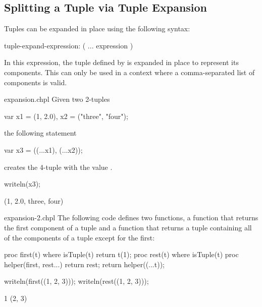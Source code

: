 \subsection{Splitting a Tuple via Tuple Expansion}
\label{Tuple_Expansion}

Tuples can be expanded in place using the following syntax:
\begin{syntax}
tuple-expand-expression:
  ( ... expression )
\end{syntax}
In this expression, the tuple defined by  is expanded
in place to represent its components.  This can only be used in a
context where a comma-separated list of components is valid.

\begin{chapelexample}{expansion.chpl}
Given two 2-tuples
\begin{chapel}
var x1 = (1, 2.0), x2 = ("three", "four");
\end{chapel}
the following statement
\begin{chapel}
var x3 = ((...x1), (...x2));
\end{chapel}
creates the 4-tuple  with the value .
\begin{chapelpost}
writeln(x3);
\end{chapelpost}
\begin{chapeloutput}
(1, 2.0, three, four)
\end{chapeloutput}
\end{chapelexample}

\begin{chapelexample}{expansion-2.chpl}
The following code defines two functions, a function  that
returns the first component of a tuple and a function  that
returns a tuple containing all of the components of a tuple except for
the first:
\begin{chapel}
proc first(t) where isTuple(t) {
  return t(1);
}
proc rest(t) where isTuple(t) {
  proc helper(first, rest...)
    return rest;
  return helper((...t));
}
\end{chapel}
\begin{chapelpost}
writeln(first((1, 2, 3)));
writeln(rest((1, 2, 3)));
\end{chapelpost}
\begin{chapeloutput}
1
(2, 3)
\end{chapeloutput}
\end{chapelexample}

